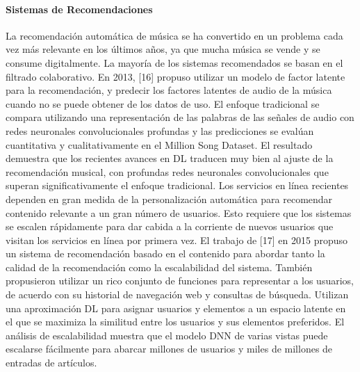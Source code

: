 \paragraph{Sistemas de Recomendaciones} La recomendación automática de música se ha convertido en un problema cada vez más relevante en los últimos años, ya que mucha música se vende y se consume digitalmente. La mayoría de los sistemas recomendados se basan en el filtrado colaborativo. En 2013, [16] propuso utilizar un modelo de factor latente para la recomendación, y predecir los factores latentes de audio de la música cuando no se puede obtener de los datos de uso. El enfoque tradicional se compara utilizando una representación de las palabras de las señales de audio con redes neuronales convolucionales profundas y las predicciones se evalúan cuantitativa y cualitativamente en el Million Song Dataset. El resultado demuestra que los recientes avances en DL traducen muy bien al ajuste de la recomendación musical, con profundas redes neuronales convolucionales que superan significativamente el enfoque tradicional. Los servicios en línea recientes dependen en gran medida de la personalización automática para recomendar contenido relevante a un gran número de usuarios. Esto requiere que los sistemas se escalen rápidamente para dar cabida a la corriente de nuevos usuarios que visitan los servicios en línea por primera vez. El trabajo de [17] en 2015 propuso un sistema de recomendación basado en el contenido para abordar tanto la calidad de la recomendación como la escalabilidad del sistema. También propusieron utilizar un rico conjunto de funciones para representar a los usuarios, de acuerdo con su historial de navegación web y consultas de búsqueda. Utilizan una aproximación DL para asignar usuarios y elementos a un espacio latente en el que se maximiza la similitud entre los usuarios y sus elementos preferidos. El análisis de escalabilidad muestra que el modelo DNN de varias vistas puede escalarse fácilmente para abarcar millones de usuarios y miles de millones de entradas de artículos.

